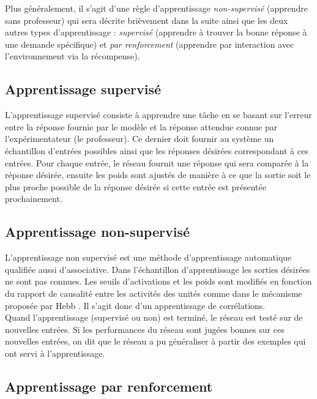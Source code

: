Plus généralement, il s'agit d'une règle d'apprentissage \textit{non-supervisé} (apprendre sans professeur) qui sera décrite brièvement dans la suite ainsi que les deux autres types d'apprentissage : \textit{supervisé} (apprendre à trouver la bonne réponse à une demande spécifique) et \textit{par renforcement} (apprendre par interaction avec l'environnement via la récompense).\\

\subsection{Apprentissage supervisé}

L'apprentissage supervisé consiste à apprendre une tâche en se basant sur l'erreur entre la réponse fournie par le modèle et la réponse attendue connue par l'expérimentateur (le professeur). Ce dernier doit fournir au système un échantillon d'entrées possibles ainsi que les réponses désirées correspondant à ces entrées. Pour chaque entrée, le réseau fournit une réponse qui sera comparée à la réponse désirée, ensuite les poids sont ajustés de manière à ce que la sortie soit le plus proche possible de la réponse désirée si cette entrée est présentée prochainement. %

\subsection{Apprentissage non-supervisé}\label{AS}



L'apprentissage non supervisé est une méthode d'apprentissage automatique qualifiée aussi d'associative. Dans l'échantillon d'apprentissage les sorties désirées ne sont pas connues. Les seuils d'activations et les poids sont modifiés en fonction du rapport de causalité entre les activités des unités comme dans le mécanisme proposée par Hebb \cite{Hebb:1949}. Il s'agit donc d'un apprentissage de corrélations.\\

Quand l'apprentissage (supervisé ou non) est terminé, le réseau est testé sur de nouvelles entrées. Si les performances du réseau sont jugées bonnes sur ces nouvelles entrées, on dit que le réseau a pu généraliser à partir des exemples qui ont servi à l'apprentissage.\\

\subsection{Apprentissage par renforcement}

